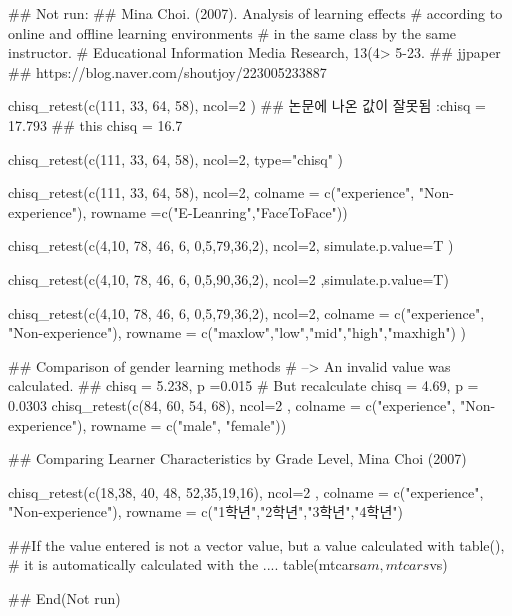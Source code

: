 \documentclass[a4paper]{book}
\begin{document}
\begin{Examples}
\begin{ExampleCode}

\#\# Not run: 
## Mina Choi. (2007). Analysis of learning effects
# according to online and offline learning environments
#  in the same class by the same instructor.
#  Educational Information Media Research, 13(4>  5-23.
## jjpaper
## https://blog.naver.com/shoutjoy/223005233887

chisq_retest(c(111, 33, 64, 58), ncol=2 )
## 논문에 나온 값이 잘못됨 :chisq = 17.793
## this chisq = 16.7

chisq_retest(c(111, 33, 64, 58), ncol=2, type="chisq" )

chisq_retest(c(111, 33, 64, 58), ncol=2,
  colname = c("experience", "Non-experience"),
  rowname =c("E-Leanring","FaceToFace"))

chisq_retest(c(4,10, 78, 46, 6, 0,5,79,36,2),
  ncol=2, simulate.p.value=T )

chisq_retest(c(4,10, 78, 46, 6, 0,5,90,36,2),
  ncol=2 ,simulate.p.value=T)

chisq_retest(c(4,10, 78, 46, 6, 0,5,79,36,2), ncol=2,
  colname = c("experience", "Non-experience"),
  rowname = c("maxlow","low","mid","high","maxhigh") )


##  Comparison of gender learning methods
# --> An invalid value was calculated.
## chisq = 5.238, p =0.015
# But recalculate chisq = 4.69, p = 0.0303
chisq_retest(c(84, 60, 54, 68), ncol=2 ,
             colname = c("experience", "Non-experience"),
                          rowname = c("male", "female"))

## Comparing Learner Characteristics by Grade Level, Mina Choi (2007)

chisq_retest(c(18,38, 40, 48, 52,35,19,16), ncol=2 ,
colname = c("experience", "Non-experience"),
rowname = c("1학년","2학년","3학년","4학년")


##If the value entered is not a vector value, but a value calculated with table(),
# it is automatically calculated with the ....
table(mtcars$am, mtcars$vs) %


## End(Not run)


\end{ExampleCode}
\end{Examples}
\end{document}
